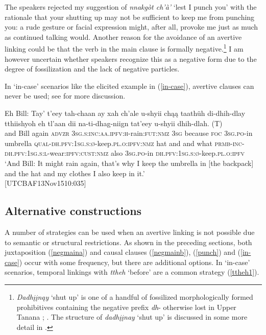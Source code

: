\documentclass[output=paper,colorlinks,citecolor=brown
]{langscibook}
\begin{document}
The speakers rejected my suggestion of \textit{nnakgòt ch'à'} `lest I punch you' with the rationale that your shutting up may not be sufficient to keep me from punching you: a rude gesture or facial expression might, after all, provoke me just as much as continued talking would. Another reason for the avoidance of an avertive linking could be that the verb in the main clause is formally negative.\footnote{\textit{Dadhįįnąy} `shut up' is one of a handful of fossilized morphologically formed prohibitives containing the negative prefix \textit{dh}- otherwise lost in Upper Tanana \citep{KariJ1993, vanGelderenE2008dene}; \citet[472]{LovickO2020}. The structure of \textit{dadhįįnay} `shut up' is discussed in some more detail in  \citet{LovickO2020ijal}. } I am however uncertain whether speakers recognize this as a negative form due to the degree of fossilization and the lack of negative particles.

In `in-case' scenarios like the elicited example in (\ref{in-case}), avertive clauses can never be used; see  for more discussion.

\ea \label{in-case}
\gll  Eh Bill: Tay' t'eey tah-chaan ay xah ch'ale  u-shyii {chąą taathüh} di-dhih-dlay tthiishyoh eh tl'aan dii na-ti-dhag-niign tat'eey u-shyii {dhih-dlah. \textnormal{(T)}} \\
and Bill again \textsc{advzr} \textsc{3sg.s:inc:aa.ipfv:h}-rain:\textsc{fut:nmz} \textsc{3sg} because \textsc{foc} \textsc{3sg.po}-in umbrella \textsc{qual-dh.pfv:1sg.s:ø}-keep.\textsc{pl.o:ipfv:nmz} hat and and what \textsc{prmb-inc-dh.pfv:1sg.s:l}-wear:\textsc{ipfv:cust:nmz} also \textsc{3sg.po}-in \textsc{dh.pfv:1sg.s:ø}-keep.\textsc{pl.o:ipfv} \\
\glt `And Bill: It might rain again, that's why I keep the umbrella in [the backpack] and the hat and my clothes I also keep in it.' \\ \hfill [UTCBAF13Nov1510:035]
\z


\subsection{Alternative constructions}
\label{subsection:alternative-constru}

A number of strategies can be used when an avertive linking is not possible due to semantic or structural restrictions. As shown in the preceding sections, both juxtaposition (\ref{negmaina}) and causal clauses (\ref{negmainb}), (\ref{punch}) and (\ref{in-case}) occur with some frequency, but there are additional options. In `in-case' scenarios, temporal linkings with \textit{ttheh} `before' are a common strategy (\ref{ttheh1}). 
\end{document}
